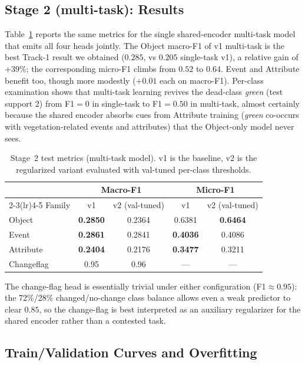 \documentclass[journal]{IEEEtran}
\begin{document}
\subsection{Stage 2 (multi-task): Results}\label{ssec:results-stage2}

Table~\ref{tab:multi-task} reports the same metrics for the single shared-encoder multi-task model that emits all four heads jointly. The Object macro-F1 of v1 multi-task is the best Track-1 result we obtained ($0.285$, vs $0.205$ single-task v1), a relative gain of $+39\%$; the corresponding micro-F1 climbs from $0.52$ to $0.64$. Event and Attribute benefit too, though more modestly ($+0.01$ each on macro-F1). Per-class examination shows that multi-task learning revives the dead-class \emph{green} (test support 2) from F1$=0$ in single-task to F1$=0.50$ in multi-task, almost certainly because the shared encoder absorbs cues from Attribute training (\emph{green} co-occurs with vegetation-related events and attributes) that the Object-only model never sees.

\begin{table}[!t]
\caption{Stage~2 test metrics (multi-task model). v1 is the baseline, v2 is the regularized variant evaluated with val-tuned per-class thresholds.}
\label{tab:multi-task}
\centering
\small
\begin{tabular}{@{}lcccc@{}}
\toprule
 & \multicolumn{2}{c}{Macro-F1} & \multicolumn{2}{c}{Micro-F1} \\
\cmidrule(lr){2-3}\cmidrule(lr){4-5}
Family & v1 & v2 (val-tuned) & v1 & v2 (val-tuned) \\
\midrule
Object     & \textbf{0.2850} & 0.2364 & 0.6381 & \textbf{0.6464} \\
Event      & \textbf{0.2861} & 0.2841 & \textbf{0.4036} & 0.4086 \\
Attribute  & \textbf{0.2404} & 0.2176 & \textbf{0.3477} & 0.3211 \\
Changeflag & 0.95 & 0.96 & --- & --- \\
\bottomrule
\end{tabular}
\end{table}

The change-flag head is essentially trivial under either configuration (F1$\approx 0.95$): the 72\%/28\% changed/no-change class balance allows even a weak predictor to clear $0.85$, so the change-flag is best interpreted as an auxiliary regularizer for the shared encoder rather than a contested task.

\subsection{Train/Validation Curves and Overfitting}\label{ssec:overfit}
\end{document}
